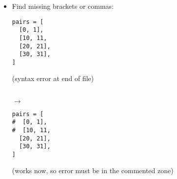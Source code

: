 \documentclass{poster}
\begin{document}
\begin{itemize}

\item Find missing brackets or commas: \\
\noindent
\begin{minipage}[t]{0.45\columnwidth}
\begin{lstlisting}
pairs = [
  [0, 1],
  [10, 11,
  [20, 21],
  [30, 31],
]
\end{lstlisting}
(syntax error at end of file)
\end{minipage}
\begin{minipage}[t]{0.05\columnwidth}
\  \\
\hspace*{1ex}$\rightarrow$
\end{minipage}
\begin{minipage}[t]{0.45\columnwidth}
\begin{lstlisting}
pairs = [
#  [0, 1],
#  [10, 11,
  [20, 21],
  [30, 31],
]
\end{lstlisting}
(works now, so error must be in the commented zone)
\end{minipage}

\end{itemize}
\end{document}
